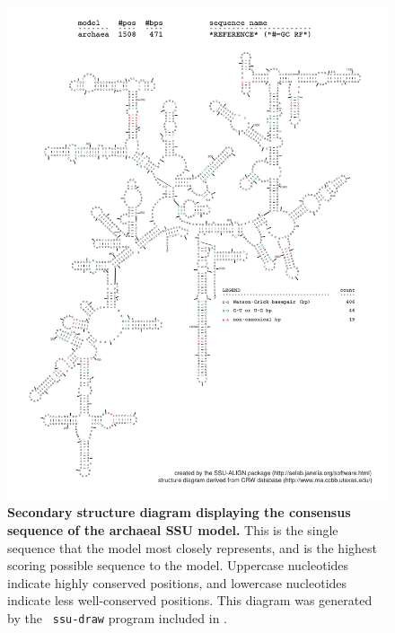 \begin{figure}[hb]
\begin{center}
\includegraphics[width=5.7in]{Figures/archaea-0p1-rf}
\end{center}
\caption[Secondary structure diagram displaying the consensus sequence
  of the archaeal SSU model]{\textbf{Secondary structure diagram displaying the
  consensus sequence of the archaeal SSU model.} 
  This is the single sequence that the model 
  most closely represents, and is the highest scoring possible
  sequence to the model. Uppercase nucleotides indicate highly conserved positions,
  and lowercase nucleotides indicate less well-conserved positions.
  This diagram was generated by the {\tt
  ssu-draw} program included in .}
\label{fig:arcrf}
\end{figure}

